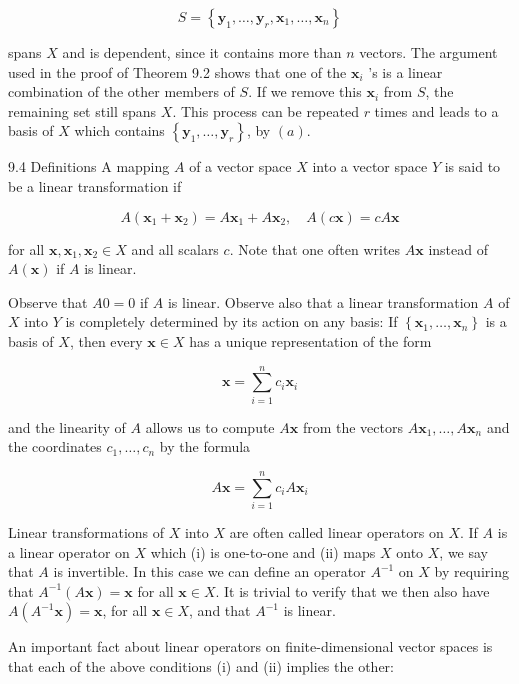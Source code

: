 \documentclass[10pt]{article}
\begin{document}
$$
S=\left\{\mathbf{y}_{1}, \ldots, \mathbf{y}_{r}, \mathbf{x}_{1}, \ldots, \mathbf{x}_{n}\right\}
$$

spans $X$ and is dependent, since it contains more than $n$ vectors. The argument used in the proof of Theorem 9.2 shows that one of the $\mathbf{x}_{i}$ 's is a linear combination of the other members of $S$. If we remove this $\mathbf{x}_{i}$ from $S$, the remaining set still spans $X$. This process can be repeated $r$ times and leads to a basis of $X$ which contains $\left\{\mathbf{y}_{1}, \ldots, \mathbf{y}_{r}\right\}$, by $(a)$.

9.4 Definitions A mapping $A$ of a vector space $X$ into a vector space $Y$ is said to be a linear transformation if

$$
A\left(\mathbf{x}_{1}+\mathbf{x}_{2}\right)=A \mathbf{x}_{1}+A \mathbf{x}_{2}, \quad A(c \mathbf{x})=c A \mathbf{x}
$$

for all $\mathbf{x}, \mathbf{x}_{1}, \mathbf{x}_{2} \in X$ and all scalars $c$. Note that one often writes $A \mathbf{x}$ instead of $A(\mathbf{x})$ if $A$ is linear.

Observe that $A 0=0$ if $A$ is linear. Observe also that a linear transformation $A$ of $X$ into $Y$ is completely determined by its action on any basis: If $\left\{\mathbf{x}_{1}, \ldots, \mathbf{x}_{n}\right\}$ is a basis of $X$, then every $\mathbf{x} \in X$ has a unique representation of the form

$$
\mathbf{x}=\sum_{i=1}^{n} c_{i} \mathbf{x}_{i}
$$

and the linearity of $A$ allows us to compute $A \mathbf{x}$ from the vectors $A \mathbf{x}_{1}, \ldots, A \mathbf{x}_{n}$ and the coordinates $c_{1}, \ldots, c_{n}$ by the formula

$$
A \mathbf{x}=\sum_{i=1}^{n} c_{i} A \mathbf{x}_{i}
$$

Linear transformations of $X$ into $X$ are often called linear operators on $X$. If $A$ is a linear operator on $X$ which (i) is one-to-one and (ii) maps $X$ onto $X$, we say that $A$ is invertible. In this case we can define an operator $A^{-1}$ on $X$ by requiring that $A^{-1}(A \mathbf{x})=\mathbf{x}$ for all $\mathbf{x} \in X$. It is trivial to verify that we then also have $A\left(A^{-1} \mathbf{x}\right)=\mathbf{x}$, for all $\mathbf{x} \in X$, and that $A^{-1}$ is linear.

An important fact about linear operators on finite-dimensional vector spaces is that each of the above conditions (i) and (ii) implies the other:
\end{document}
